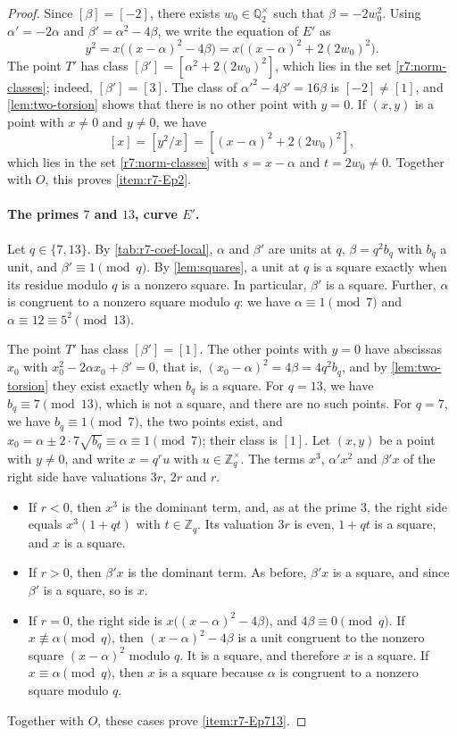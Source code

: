 \documentclass[12pt,oneside,openany]{book}
\theoremstyle{definition}
\theoremstyle{plain}
\numberwithin{equation}{chapter}
\theoremstyle{plain}
\theoremstyle{definition}
\theoremstyle{remark}
\newcommand{\Q}{\mathbb Q}
\newcommand{\Z}{\mathbb Z}
\newcommand{\sq}[1]{[#1]}
\begin{document}
\begin{proof}
Since $\sq\beta=\sq{-2}$, there exists $w_0\in\Q_2^\times$ such that
$\beta=-2w_0^2$. Using $\alpha'=-2\alpha$ and $\beta'=\alpha^2-4\beta$, we
write the equation of $E'$ as
\begin{equation}\label{r7:norm-form}
 y^2=x\bigl((x-\alpha)^2-4\beta\bigr)=x\bigl((x-\alpha)^2+2(2w_0)^2\bigr).
\end{equation}
The point $T'$ has class $\sq{\beta'}=\sq{\alpha^2+2(2w_0)^2}$, which lies
in the set \eqref{r7:norm-classes}; indeed, $\sq{\beta'}=\sq3$. The class
of $\alpha'^2-4\beta'=16\beta$ is $\sq{-2}\ne\sq1$, and
\cref{lem:two-torsion} shows that there is no other point with $y=0$. If
$(x,y)$ is a point with $x\ne0$ and $y\ne0$, we have
\[
 \sq x=\sq{y^2/x}=\sq{(x-\alpha)^2+2(2w_0)^2},
\]
which lies in the set \eqref{r7:norm-classes} with $s=x-\alpha$ and
$t=2w_0\ne0$. Together with $O$, this proves \ref{item:r7-Ep2}.

\paragraph{The primes $7$ and $13$, curve $E'$.}
Let $q\in\{7,13\}$. By \cref{tab:r7-coef-local}, $\alpha$ and $\beta'$ are
units at $q$, $\beta=q^2b_q$ with $b_q$ a unit, and $\beta'\equiv1\pmod q$.
By \cref{lem:squares}, a unit at $q$ is a square exactly when its residue
modulo $q$ is a nonzero square. In particular, $\beta'$ is a square. Further,
$\alpha$ is congruent to a nonzero square modulo $q$: we have
$\alpha\equiv1\pmod7$ and $\alpha\equiv12\equiv5^2\pmod{13}$.

The point $T'$ has class $\sq{\beta'}=\sq1$. The other points with $y=0$
have abscissas $x_0$ with $x_0^2-2\alpha x_0+\beta'=0$, that is,
$(x_0-\alpha)^2=4\beta=4q^2b_q$, and by \cref{lem:two-torsion} they exist
exactly when $b_q$ is a square. For $q=13$, we have $b_q\equiv7\pmod{13}$,
which is not a square, and there are no such points. For $q=7$, we have
$b_q\equiv1\pmod7$, the two points exist, and
$x_0=\alpha\pm2\cdot7\sqrt{b_q}\equiv\alpha\equiv1\pmod7$; their class is
$\sq1$. Let $(x,y)$ be a point with $y\ne0$, and write $x=q^ru$ with
$u\in\Z_q^\times$. The terms $x^3$, $\alpha'x^2$ and $\beta'x$ of the right
side have valuations $3r$, $2r$ and $r$.
\begin{itemize}
\item If $r<0$, then $x^3$ is the dominant term, and, as at the prime $3$,
the right side equals $x^3(1+qt)$ with $t\in\Z_q$. Its valuation $3r$ is
even, $1+qt$ is a square, and $x$ is a square.
\item If $r>0$, then $\beta'x$ is the dominant term. As before,
$\beta'x$ is a square, and since $\beta'$ is a square, so is $x$.
\item If $r=0$, the right side is $x\bigl((x-\alpha)^2-4\beta\bigr)$, and
$4\beta\equiv0\pmod q$. If $x\not\equiv\alpha\pmod q$, then
$(x-\alpha)^2-4\beta$ is a unit congruent to the nonzero square
$(x-\alpha)^2$ modulo $q$. It is a square, and therefore $x$ is a square.
If $x\equiv\alpha\pmod q$, then $x$ is a square because $\alpha$ is
congruent to a nonzero square modulo $q$.
\end{itemize}
Together with $O$, these cases prove \ref{item:r7-Ep713}.


\end{proof}
\end{document}
